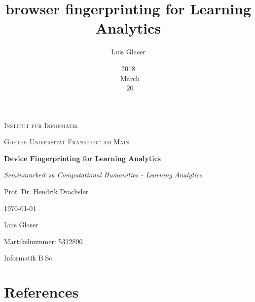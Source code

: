 \documentclass[12pt,a4paper]{article}
\title{browser fingerprinting for Learning Analytics}
\author{Luis Glaser}
\date{2018 \\ March \\ 20}
\begin{document}
\begin{titlepage}
\centering
    {\scshape\LARGE Institut für Informatik\par}
    {\scshape\Large Goethe Universität Frankfurt am Main\par}
    \vspace{2cm}
    {\huge\bfseries Device Fingerprinting for Learning Analytics\par}
    \vspace{2cm}
    {\Large\itshape Seminararbeit zu Computational Humanities - Learning Analytics\par}
    {\large Prof. Dr. Hendrik Drachsler\par}
    \vfill
	
    {\large \today\par}
    \vspace{1.5cm}

    Luis Glaser\par
    Martikelnummer: 5312890\par
    Informatik B.Sc.\par
\end{titlepage}


\tableofcontents
\pagebreak
{}






\pagebreak
\section{References}
\label{sec:References}



\pagebreak

\end{document}
